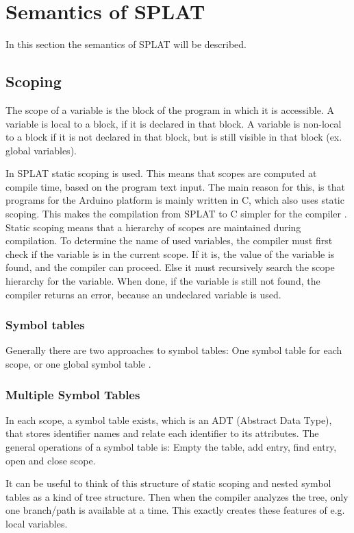 \section{Semantics of SPLAT}
In this section the semantics of SPLAT will be described. 

\subsection{Scoping}
The scope of a variable is the block of the program in which it is accessible. A variable is local to a block, if it is declared in that block. A variable is non-local to a block if it is not declared in that block, but is still visible in that block (ex. global variables).

In SPLAT static scoping is used. This means that scopes are computed at compile time, based on the program text input. The main reason for this, is that programs for the Arduino platform is mainly written in C, which also uses static scoping. This makes the compilation from SPLAT to C simpler for the compiler \citep{arduinobuild}. Static scoping means that a hierarchy of scopes are maintained during compilation. To determine the name of used variables, the compiler must first check if the variable is in the current scope. If it is, the value of the variable is found, and the compiler can proceed. Else it must recursively search the scope hierarchy for the variable. When done, if the variable is still not found, the compiler returns an error, because an undeclared variable is used.
\subsubsection{Symbol tables}
Generally there are two approaches to symbol tables: One symbol table for each scope, or one global symbol table \citep{sebesta}. 
\subsubsection*{Multiple Symbol Tables}
In each scope, a symbol table exists, which is an ADT (Abstract Data Type), that stores identifier names and relate each identifier to its attributes. The general operations of a symbol table is: Empty the table, add entry, find entry, open and close scope. 

It can be useful to think of this structure of static scoping and nested symbol tables as a kind of tree structure. Then when the compiler analyzes the tree, only one branch/path is available at a time. This exactly creates these features of e.g. local variables.

